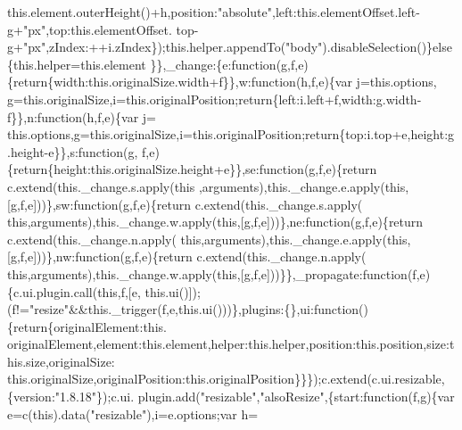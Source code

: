 \begin{DoxyCode}
      this.element.outerHeight()+h,position:\textcolor{stringliteral}{"absolute"},left:this.elementOffset.left-g+\textcolor{stringliteral}{"px"},top:this.elementOffset.
      top-g+\textcolor{stringliteral}{"px"},zIndex:++i.zIndex\});this.helper.appendTo(\textcolor{stringliteral}{"body"}).disableSelection()\}\textcolor{keywordflow}{else}\{this.helper=this.element
      \}\},\_change:\{e:\textcolor{keyword}{function}(g,f,e)\{\textcolor{keywordflow}{return}\{width:this.originalSize.width+f\}\},w:\textcolor{keyword}{function}(h,f,e)\{var j=this.options,
      g=this.originalSize,i=this.originalPosition;\textcolor{keywordflow}{return}\{left:i.left+f,width:g.width-f\}\},n:\textcolor{keyword}{function}(h,f,e)\{var j=
      this.options,g=this.originalSize,i=this.originalPosition;\textcolor{keywordflow}{return}\{top:i.top+e,height:g.height-e\}\},s:\textcolor{keyword}{function}(g,
      f,e)\{\textcolor{keywordflow}{return}\{height:this.originalSize.height+e\}\},se:\textcolor{keyword}{function}(g,f,e)\{\textcolor{keywordflow}{return} c.extend(this.\_change.s.apply(\textcolor{keyword}{this}
      ,arguments),this.\_change.e.apply(\textcolor{keyword}{this},[g,f,e]))\},sw:\textcolor{keyword}{function}(g,f,e)\{\textcolor{keywordflow}{return} c.extend(this.\_change.s.apply(\textcolor{keyword}{
      this},arguments),this.\_change.w.apply(\textcolor{keyword}{this},[g,f,e]))\},ne:\textcolor{keyword}{function}(g,f,e)\{\textcolor{keywordflow}{return} c.extend(this.\_change.n.apply(\textcolor{keyword}{
      this},arguments),this.\_change.e.apply(\textcolor{keyword}{this},[g,f,e]))\},nw:\textcolor{keyword}{function}(g,f,e)\{\textcolor{keywordflow}{return} c.extend(this.\_change.n.apply(\textcolor{keyword}{
      this},arguments),this.\_change.w.apply(\textcolor{keyword}{this},[g,f,e]))\}\},\_propagate:\textcolor{keyword}{function}(f,e)\{c.ui.plugin.call(\textcolor{keyword}{this},f,[e,
      this.ui()]);(f!=\textcolor{stringliteral}{"resize"}&&this.\_trigger(f,e,this.ui()))\},plugins:\{\},ui:\textcolor{keyword}{function}()\{\textcolor{keywordflow}{return}\{originalElement:this.
      originalElement,element:this.element,helper:this.helper,position:this.position,size:this.size,originalSize:
      this.originalSize,originalPosition:this.originalPosition\}\}\});c.extend(c.ui.resizable,\{version:\textcolor{stringliteral}{"1.8.18"}\});c.ui.
      plugin.add(\textcolor{stringliteral}{"resizable"},\textcolor{stringliteral}{"alsoResize"},\{start:\textcolor{keyword}{function}(f,g)\{var e=c(\textcolor{keyword}{this}).data(\textcolor{stringliteral}{"resizable"}),i=e.options;var h=\textcolor{keyword}{
}
\end{DoxyCode}
